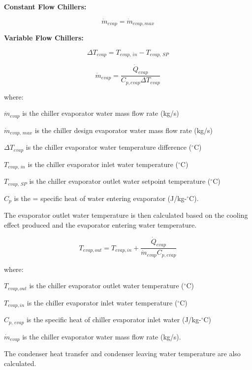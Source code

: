 \textbf{Constant Flow Chillers:}

\begin{equation}
{\dot m_{evap}} = {\dot m_{evap,max}}
\end{equation}

\textbf{Variable Flow Chillers:}

\begin{equation}
\Delta {T_{evap}} = {T_{evap,\,in}} - {T_{evap,\,SP}}
\end{equation}

\begin{equation}
  \dot{m}_{evap} = \frac{\dot{Q}_{evap}}{C_{p,evap} \Delta T_{evap}}
\end{equation}

where:

\({\dot m_{evap}}\) is the chiller evaporator water mass flow rate (kg/s)

\({\dot m_{evap,\,max}}\) is the chiller design evaporator water mass flow rate (kg/s)

\(\Delta {T_{evap}}\) is the chiller evaporator water temperature difference (\(^{\circ}\)C)

\({T_{evap,\,in}}\) is the chiller evaporator inlet water temperature (\(^{\circ}\)C)

\({T_{evap,\,SP}}\) is the chiller evaporator outlet water setpoint temperature (\(^{\circ}\)C)

\({C_p}\) is the = specific heat of water entering evaporator (J/kg-\(^{\circ}\)C).

The evaporator outlet water temperature is then calculated based on the cooling effect produced and the evaporator entering water temperature.

\begin{equation}
  T_{evap,out} = T_{evap,in} + \frac{\dot{Q}_{evap}}{\dot{m}_{evap}C_{p,evap}}
\end{equation}

where:

\({T_{evap,out}}\) is the chiller evaporator outlet water temperature (\(^{\circ}\)C)

\({T_{evap,in}}\) is the chiller evaporator inlet water temperature (\(^{\circ}\)C)

\({C_{p,\,evap}}\) is the specific heat of chiller evaporator inlet water (J/kg-\(^{\circ}\)C)

\({\dot m_{evap}}\) is the chiller evaporator water mass flow rate (kg/s).

The condenser heat transfer and condenser leaving water temperature are also calculated.

